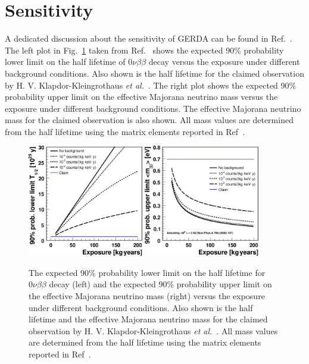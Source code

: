 \section{Sensitivity}
\label{sec:gerda:sens}
A dedicated discussion about the sensitivity of GERDA can be found in Ref.~\cite{Cal06}. The left plot in Fig.~\ref{fig:gerda:limit} taken from Ref.~\cite{Cal06} shows the expected 90\% probability lower limit on the half lifetime of $0\nu\beta\beta$ decay versus the exposure under different background conditions. Also shown is the half lifetime for the claimed observation by H. V. Klapdor-Kleingrothaus \textit{et   al.}~\cite{Hei04}. The right plot shows the expected 90\% probability upper limit on the effective Majorana neutrino mass versus the exposure under different background conditions. The effective Majorana neutrino mass for the claimed observation is also shown. All mass values are determined from the half lifetime using the matrix elements reported in Ref~\cite{Rod07}.
\begin{figure}[tbhp]
  \centering
  \includegraphics[width=0.45\textwidth]{limit_halflife}  \hfil
  \includegraphics[width=0.45\textwidth]{limit_mass}
  \caption{The expected 90\% probability lower limit on the half     lifetime for $0\nu\beta\beta$ decay (left) and the expected 90\%     probability upper limit on the effective Majorana neutrino mass     (right) versus the exposure under different background conditions.     Also shown is the half lifetime and the effective Majorana     neutrino mass for the claimed observation by H. V.     Klapdor-Kleingrothaus \textit{et al.}~\cite{Hei04}. All mass     values are determined from the half lifetime using the matrix     elements reported in Ref~\cite{Rod07}.}
  \label{fig:gerda:limit}
\end{figure}

